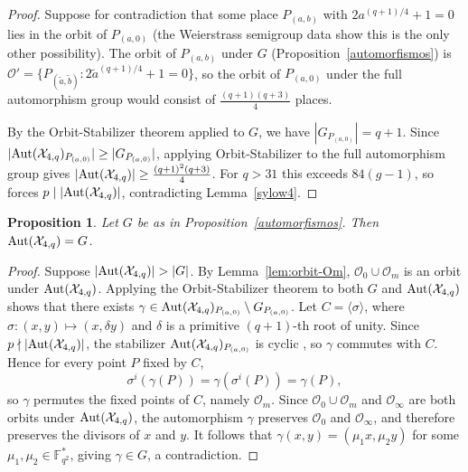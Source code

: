 \documentclass[12pt]{amsart}
\newtheorem{proposition}[theorem]{Proposition}
\theoremstyle{remark}
\theoremstyle{definition}
\def\Aut{{\rm Aut}}
\begin{document}
\begin{proof}
    Suppose for contradiction that some place $P_{(a,b)}$ with 
    $2a^{(q+1)/4} + 1 = 0$ lies in the orbit of $P_{(a,0)}$ (the 
    Weierstrass semigroup data show this is the only other possibility). 
    The orbit of $P_{(a,b)}$ under $G$ (Proposition~\ref{automorfismos}) 
    is $\mathcal{O}' = \{P_{(\tilde{a},\tilde{b})} : 2\tilde{a}^{(q+1)/4} 
    + 1 = 0\}$, so the orbit of $P_{(a,0)}$ under the full automorphism 
    group would consist of $\frac{(q+1)(q+3)}{4}$ places.

    By the Orbit-Stabilizer theorem applied to $G$, we have 
    $|G_{P_{(a,0)}}| = q+1$. Since 
    $|\Aut(\mathcal{X}_{4,q})_{P_{(a,0)}}| \ge |G_{P_{(a,0)}}|$, 
    applying Orbit-Stabilizer to the full automorphism group gives 
    $|\Aut(\mathcal{X}_{4,q})| \ge \frac{(q+1)^2(q+3)}{4}$. For $q > 31$ 
    this exceeds $84(g-1)$, so \cite[Theorem~11.56]{HKT} forces 
    $p \mid |\Aut(\mathcal{X}_{4,q})|$, contradicting Lemma~\ref{sylow4}.
\end{proof}

\begin{proposition}\label{aut1}
    Let $G$ be as in Proposition~\ref{automorfismos}. Then 
    $\Aut(\mathcal{X}_{4,q}) = G$.
\end{proposition}

\begin{proof}
    Suppose $|\Aut(\mathcal{X}_{4,q})| > |G|$. By Lemma~\ref{lem:orbit-Om}, $\mathcal{O}_0 \cup \mathcal{O}_m$ is an 
    orbit under $\Aut(\mathcal{X}_{4,q})$. Applying the Orbit-Stabilizer 
    theorem to both $G$ and $\Aut(\mathcal{X}_{4,q})$ shows that there 
    exists $\gamma \in \Aut(\mathcal{X}_{4,q})_{P_{(a,0)}} \setminus 
    G_{P_{(a,0)}}$. Let $C = \langle \sigma \rangle$, where 
    $\sigma \colon (x,y) \mapsto (x, \delta y)$ and $\delta$ is a primitive 
    $(q+1)$-th root of unity. Since $p \nmid |\Aut(\mathcal{X}_{4,q})|$, 
    the stabilizer $\Aut(\mathcal{X}_{4,q})_{P_{(a,0)}}$ is cyclic 
    \cite[Theorem~11.49]{HKT}, so $\gamma$ commutes with $C$. Hence for 
    every point $P$ fixed by $C$,
    \begin{equation}\label{sigma-gamma}
			\sigma^i(\gamma(P)) = \gamma(\sigma^i(P)) = \gamma(P),
		\end{equation}
    so $\gamma$ permutes the fixed points of $C$, namely $\mathcal{O}_m$. 
    Since $\mathcal{O}_0 \cup \mathcal{O}_m$ and $\mathcal{O}_\infty$ are 
    both orbits under $\Aut(\mathcal{X}_{4,q})$, the automorphism $\gamma$ 
    preserves $\mathcal{O}_0$ and $\mathcal{O}_\infty$, and therefore 
    preserves the divisors of $x$ and $y$. It follows that 
    $\gamma(x,y) = (\mu_1 x, \mu_2 y)$ for some 
    $\mu_1, \mu_2 \in \mathbb{F}_{q^2}^*$, giving $\gamma \in G$, 
    a contradiction.
\end{proof}
\end{document}
